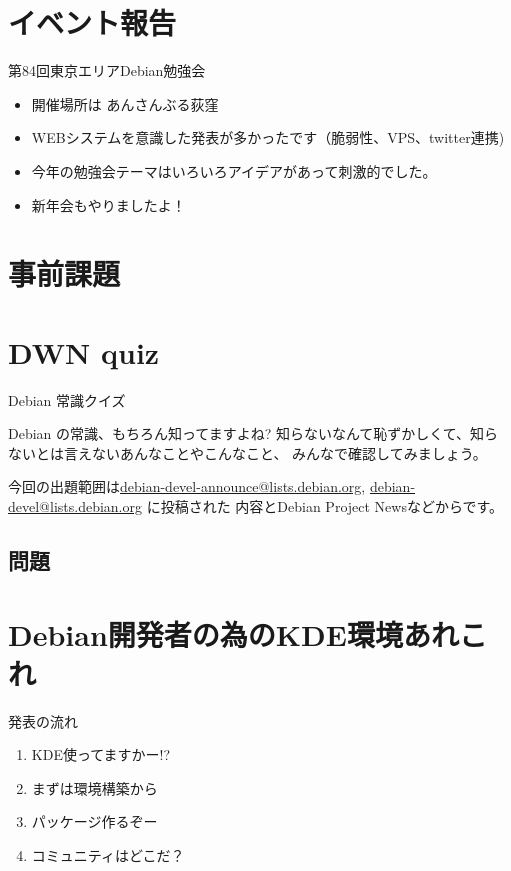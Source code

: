 \section{イベント報告}

\begin{frame}{第84回東京エリアDebian勉強会}
\begin{itemize}
\item 開催場所は あんさんぶる荻窪
\item WEBシステムを意識した発表が多かったです（脆弱性、VPS、twitter連携)
\item 今年の勉強会テーマはいろいろアイデアがあって刺激的でした。
\item 新年会もやりましたよ！
\end{itemize}
\end{frame}

\section{事前課題}
{\footnotesize
 
}

\section{DWN quiz}
\begin{frame}{Debian 常識クイズ}

Debian の常識、もちろん知ってますよね?
知らないなんて恥ずかしくて、知らないとは言えないあんなことやこんなこと、
みんなで確認してみましょう。

今回の出題範囲は\url{debian-devel-announce@lists.debian.org},
\url{debian-devel@lists.debian.org} に投稿された
内容とDebian Project Newsなどからです。

\end{frame}

\subsection{問題}


\section{Debian開発者の為のKDE環境あれこれ}

\begin{frame}{発表の流れ}
\begin{enumerate}
\item KDE使ってますかー!?
\item まずは環境構築から
\item パッケージ作るぞー
\item コミュニティはどこだ？
\end{enumerate}
\end{frame}

